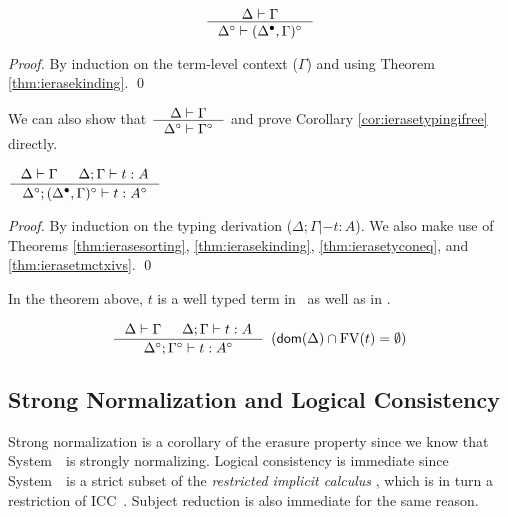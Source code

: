 \begin{theorem}
\label{thm:ierasetmctxivs}
\[ \inference{\Delta |- \Gamma}{\Delta^\circ |- (\Delta^\bullet,\Gamma)^\circ}
\]
\end{theorem}
\begin{proof}
        By induction on the term-level context ($\Gamma$)
        and using Theorem \ref{thm:ierasekinding}.
        \qed
\end{proof}
\begin{remark}
We can also show that
$\inference{\Delta |- \Gamma}{\Delta^\circ |- \Gamma^\circ}$
and prove Corollary \ref{cor:ierasetypingifree} directly.
\end{remark}

\begin{theorem}
\label{thm:ierasetypingall}
$ \inference{\Delta |- \Gamma & \Delta;\Gamma |- t : A}
                {\Delta^\circ;(\Delta^\bullet,\Gamma)^\circ |- t : A^\circ}
$
\end{theorem}
\begin{proof}
        By induction on the typing derivation ($\Delta;\Gamma |- t : A$).
        We also make use of Theorems
        \ref{thm:ierasesorting},
        \ref{thm:ierasekinding},
        \ref{thm:ierasetyconeq}, and
        \ref{thm:ierasetmctxivs}.
        \qed
\end{proof}
\begin{remark}
        In the theorem above, $t$ is a well typed term
        in \Fw\ as well as in \Fi.
\end{remark}

\begin{corollary}
\label{cor:ierasetypingifree}
\[ \inference{ \Delta |- \Gamma & \Delta;\Gamma |- t : A}
                {\Delta^\circ;\Gamma^\circ |- t : A^\circ}
                {\enspace(\dom(\Delta)\cap\FV(t) = \emptyset)}
\]
\end{corollary}

\subsection{Strong Normalization and Logical Consistency} \label{ssec:sn}
Strong normalization is a corollary of the erasure property since we know that
System~\Fw\ is strongly normalizing. Logical consistency is immediate since
System~\Fi\ is a strict subset of the \emph{restricted implicit calculus}
\cite{Miquel00}, which is in turn a restriction of ICC~\cite{Miquel01}.
Subject reduction is also immediate for the same reason.

